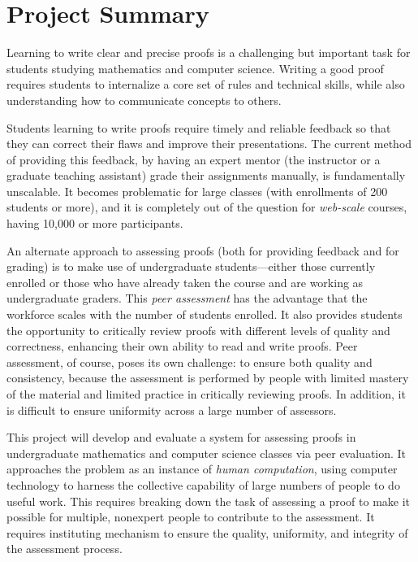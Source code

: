 \documentclass[12pt]{article}
\begin{document}
\section*{Project Summary}

Learning to write clear and precise proofs is a challenging but
important task for students studying mathematics and computer science.
Writing a good proof requires students to internalize a core set of
rules and technical skills, while also understanding how to
communicate concepts to others.

Students learning to write proofs require timely and reliable feedback
so that they can correct their flaws and improve their
presentations.  The current method of providing this feedback, by
having an expert mentor (the instructor or a graduate teaching assistant)
grade their assignments manually, is fundamentally unscalable.  It becomes
problematic for large classes (with enrollments of 200 students or
more), and it is completely out of the question for {\em web-scale}
courses, having 10,000 or more participants.

An alternate approach to assessing proofs (both for providing feedback
and for grading) is to make use of undergraduate students---either
those currently enrolled or those who have already taken the course
and are working as undergraduate graders.  This {\em peer assessment}
has the advantage that the workforce scales with the number of
students enrolled.  It also provides students the opportunity to
critically review proofs with different levels of quality and
correctness, enhancing their own ability to read and write proofs.
Peer assessment, of course, poses its own challenge: to ensure both
quality and consistency, because the assessment is performed by people
with limited mastery of the material and limited practice in
critically reviewing proofs.  In addition, it is difficult to ensure
uniformity across a large number of assessors.

This project will develop and evaluate a system for assessing proofs
in undergraduate mathematics and computer science classes via peer
evaluation.  It approaches the problem as an instance of {\em human
  computation}, using computer technology to harness the collective
capability of large numbers of people to do useful work.  This
requires breaking down the task of assessing a proof to make it
possible for multiple, nonexpert people to contribute to the
assessment.  It requires instituting mechanism to ensure the quality,
uniformity, and integrity of the assessment process.
\end{document}
